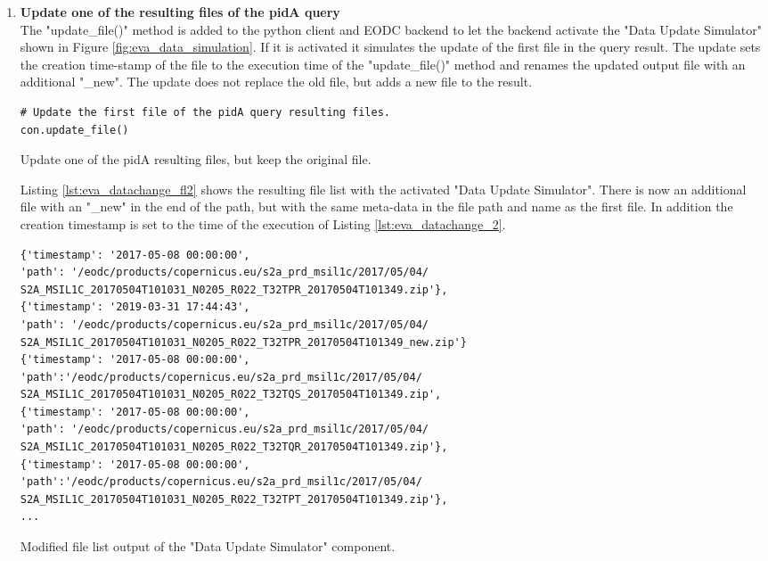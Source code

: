 \documentclass[draft,final]{vutinfth} %
\newenvironment{code}{\captionsetup{type=listing}}{}
\begin{document}
\begin{enumerate}
	\setcounter{enumi}{+1}
	\item \textbf{Update one of the resulting files of the pidA query} \\
	The "update\_file()" method is added to the python client and EODC backend to let the backend activate the "Data Update Simulator" shown in Figure \ref{fig:eva_data_simulation}. If it is activated it simulates the update of the first file in the query result. The update sets the creation time-stamp of the file to the execution time of the "update\_file()" method and renames the updated output file with an additional "\_new". The update does not replace the old file, but adds a new file to the result. 
	\begin{code}
		\begin{verbatim}
# Update the first file of the pidA query resulting files.
con.update_file()
		\end{verbatim}
		\caption{Update one of the pidA resulting files, but keep the original file.}
		\label{lst:eva_datachange_2}
	\end{code}
	
	Listing \ref{lst:eva_datachange_fl2} shows the resulting file list with the activated "Data Update Simulator". There is now an additional file with an "\_new" in the end of the path, but with the same meta-data in the file path and name as the first file. In addition the creation timestamp is set to the time of the execution of Listing \ref{lst:eva_datachange_2}.
	
	\begin{code}
		\begin{verbatim}
{'timestamp': '2017-05-08 00:00:00', 
'path': '/eodc/products/copernicus.eu/s2a_prd_msil1c/2017/05/04/
S2A_MSIL1C_20170504T101031_N0205_R022_T32TPR_20170504T101349.zip'}, 
{'timestamp': '2019-03-31 17:44:43', 
'path': '/eodc/products/copernicus.eu/s2a_prd_msil1c/2017/05/04/
S2A_MSIL1C_20170504T101031_N0205_R022_T32TPR_20170504T101349_new.zip'}
{'timestamp': '2017-05-08 00:00:00',
'path':'/eodc/products/copernicus.eu/s2a_prd_msil1c/2017/05/04/
S2A_MSIL1C_20170504T101031_N0205_R022_T32TQS_20170504T101349.zip', 
{'timestamp': '2017-05-08 00:00:00', 
'path': '/eodc/products/copernicus.eu/s2a_prd_msil1c/2017/05/04/
S2A_MSIL1C_20170504T101031_N0205_R022_T32TQR_20170504T101349.zip'}, 
{'timestamp': '2017-05-08 00:00:00',
'path':'/eodc/products/copernicus.eu/s2a_prd_msil1c/2017/05/04/
S2A_MSIL1C_20170504T101031_N0205_R022_T32TPT_20170504T101349.zip'},
...
		\end{verbatim}
		\caption{Modified file list output of the "Data Update Simulator" component.}
		\label{lst:eva_datachange_fl2}
	\end{code}
	

\end{enumerate}
\end{document}
